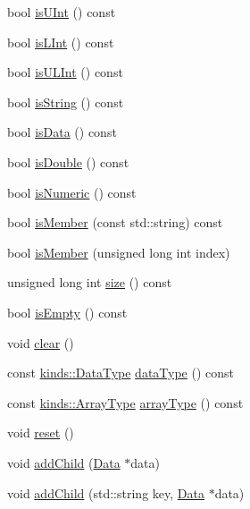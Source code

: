 \begin{DoxyCompactItemize}
\item 
bool \hyperlink{classklop_1_1Data_a761ed85bf7b011406d5fed8625593824}{isUInt} () const 
\item 
bool \hyperlink{classklop_1_1Data_af6b277d0a14fff4cc7e548ed56885135}{isLInt} () const 
\item 
bool \hyperlink{classklop_1_1Data_ad61409548752c69c1ff582e986b4b997}{isULInt} () const 
\item 
bool \hyperlink{classklop_1_1Data_a4f940388ba62396a4cb695a799e0d5a0}{isString} () const 
\item 
bool \hyperlink{classklop_1_1Data_afc7d0518c0f02c9aa290bb64536c7350}{isData} () const 
\item 
bool \hyperlink{classklop_1_1Data_ab267b89e2607035d92d394e8fe60aac8}{isDouble} () const 
\item 
bool \hyperlink{classklop_1_1Data_a89224d45953494c69ada7702242e1477}{isNumeric} () const 
\item 
bool \hyperlink{classklop_1_1Data_a37c8b903f771f457db0ffb878afef8c4}{isMember} (const std::string) const 
\item 
bool \hyperlink{classklop_1_1Data_a8a49ddc37a5811dd90a6e09773d973da}{isMember} (unsigned long int index)
\item 
unsigned long int \hyperlink{classklop_1_1Data_a2ea33a6b2692b9685d590377d45e2061}{size} () const 
\item 
bool \hyperlink{classklop_1_1Data_a3653a0bee5cb788b21c53bc7d014880f}{isEmpty} () const 
\item 
void \hyperlink{classklop_1_1Data_abaf5103b2b56f0a0e48aa25a7b9b6b26}{clear} ()
\item 
const \hyperlink{namespaceklop_1_1kinds_acddfa6fd45450d8db3eb8c288d03202b}{kinds::DataType} \hyperlink{classklop_1_1Data_a9f7866240fddc473a08bd03c55ab0360}{dataType} () const 
\item 
const \hyperlink{namespaceklop_1_1kinds_aca835f7cfa300361cd67d6248b41ccd0}{kinds::ArrayType} \hyperlink{classklop_1_1Data_aa38d008dbf5d8060745c790d3506944b}{arrayType} () const 
\item 
void \hyperlink{classklop_1_1Data_a49da2dac32757f1133a51a405a281dd8}{reset} ()
\item 
void \hyperlink{classklop_1_1Data_a1c3a4138959e444d9a652154e6c87eb5}{addChild} (\hyperlink{classklop_1_1Data}{Data} $\ast$data)
\item 
void \hyperlink{classklop_1_1Data_a3be6fccd807dc2a26690a911224fe363}{addChild} (std::string key, \hyperlink{classklop_1_1Data}{Data} $\ast$data)
\item 

\end{DoxyCompactItemize}
